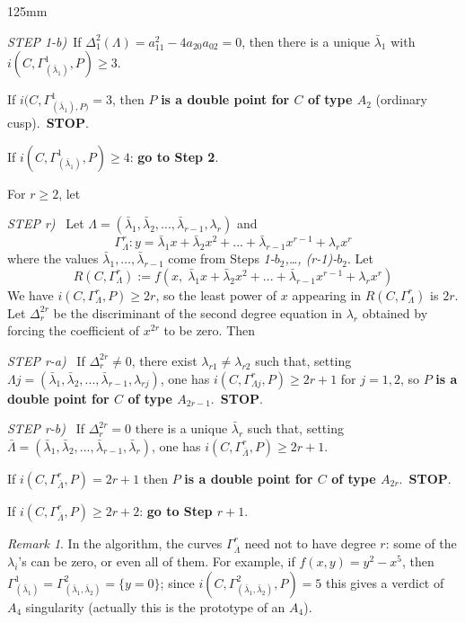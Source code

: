 \documentclass[draft]{amsart}
\theoremstyle{definition}
\theoremstyle{remark}
\newtheorem{rem}[thm]{Remark}
\theoremstyle{definition}
\def\a{\bigskip \par \noindent}
\def\dd{\medskip \par \noindent}
\def\l{\lambda}
\begin{document}
\begin{algorithm}[H]
\begin{boxedminipage}{125mm}
\begin{algorithmic}[1]
	\a	\STATE\label{Alg1Step1b}{\it STEP 1-b)}\ If  $\Delta^2_1(\Lambda) = a_{11}^2-4a_{20}a_{02}= 0$, then there is a unique $\bar{\l}_1$ with $i(C,\Gamma^1_{(\bar{\l}_1)},P)\geq 3$.
	\dd {\it Step 1-$b_1$)} If $i(C,\Gamma^1_{(\bar{\l}_1),P)}= 3$, then $P$ {\bf is a double point for $C$ of type $A_2$} (ordinary cusp).\ {\bf STOP}.    
	\dd {\it Step 1-$b_2$)} If $i(C,\Gamma^1_{(\bar{\l}_1)},P) \geq 4$: {\bf go to Step 2}.
		
\medskip	
For $r\geq 2$, let 	
\a \STATE\label{Alg1Stepr}{\it STEP r)} \ Let $\Lambda = (\bar{\l}_1,\bar{\l}_2,...,\bar{\l}_{r-1}, \l_r)$ and
   $$\Gamma^r_{ \Lambda} : y=\bar{\l}_1 x +\bar{\l}_2x^2+...+\bar{\l}_{r-1}x^{r-1}+\l_r x^r $$ where the values $\bar{\l}_1,\dots,\bar{\l}_{r-1}$ come from Steps {\it 1-$b_2$,\dots, (r-1)-$b_2$}. Let $$R(C,\Gamma^r_{\Lambda}) :=f(x,\; \bar{\l}_1x+\bar{\l}_2x^2+...+\bar{\l}_{r-1}x^{r-1}+\l_r x^r )$$
 We have $i(C,\Gamma^r_{{\Lambda}},P)\geq 2r$, so the least power of $x$ appearing in $R(C,\Gamma^r_{\Lambda})$ is $2r$. Let  $\Delta^{2r}_r$ be the discriminant of the second degree equation in $\l_r$ obtained by forcing the coefficient of $x^{2r}$ to be zero. Then

 	\a \STATE\label{Alg1Stepr.a}{\it STEP r-a)} \  If $\Delta^{2r}_r\neq 0$, there exist $\l_{r1}\neq \l_{r2}$ such that, setting $\Lambda j = (\bar{\l}_1,\bar{\l}_2,...,\bar{\l}_{r-1}, \l_{rj})$, one has   $i(C,\Gamma^r_{ \Lambda j },P)\geq 2r+1$ for $j=1,2$, so $P$ {\bf is a double point for $C$ of type $A_{2r-1}$}.\ {\bf STOP}.

 	\a \STATE\label{Alg1Stepr.b}{\it STEP r-b)} \  If $\Delta^{2r}_r= 0$ there is a unique $\bar{\l}_r$  such that, setting $\bar \Lambda = (\bar{\l}_1,\bar{\l}_2,...,\bar{\l}_{r-1}, \bar \l_r)$, one has $i(C,\Gamma^r_{\bar \Lambda},P)\geq 2r+1$. 
	\dd {\it Step 1-$b_1$)} If $i(C,\Gamma^r_{\overline{\Lambda}},P)= 2r+1$  then $P$ {\bf is a double point for $C$ of type $A_{2r}$}.\ {\bf STOP}. 
	\dd {\it Step 1-$b_2$)} If $i(C,\Gamma^r_{\overline{\Lambda}},P)\geq 2r+2$: {\bf go to Step $r+1$}.
 	
    \end{algorithmic}
\end{boxedminipage}

\end{algorithm}

\bigskip
\begin{rem}  In the algorithm, the curves $\Gamma^r_{\overline{\Lambda}}$ need not to have degree $r$: some of the $\l_i$'s can be zero, or even all of them. For example, if $f(x,y) = y^2-x^5$, then $\Gamma^1_{(\bar \l_1)} = \Gamma^2_{(\bar\l_1,\bar\l_2)} = \{y=0\}$; since $i(C,\Gamma^2_{(\bar\l_1,\bar\l_2)},P)= 5$ this gives a verdict of $A_4$ singularity (actually this is the prototype of an $A_4$).
\end{rem}
\end{document}
